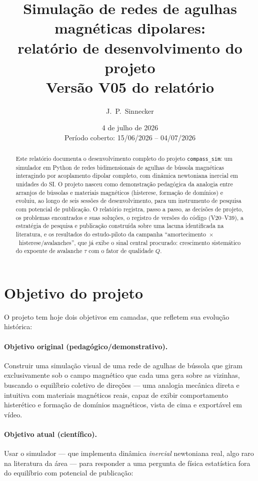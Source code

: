 \documentclass[11pt,a4paper]{article}
\title{\textbf{Simulação de redes de agulhas magnéticas dipolares:\\
relatório de desenvolvimento do projeto \code{compass\_sim}}\\[1ex]
\large Versão V05 do relatório}
\author{J.~P.~Sinnecker}
\date{4 de julho de 2026\\[0.5ex]
\small Período coberto: 15/06/2026 -- 04/07/2026}
\newcommand{\code}[1]{\texttt{#1}}
\begin{document}
\maketitle

\begin{abstract}
\noindent
Este relatório documenta o desenvolvimento completo do projeto
\code{compass\_sim}: um simulador em Python de redes bidimensionais de
agulhas de bússola magnéticas interagindo por acoplamento dipolar
completo, com dinâmica newtoniana inercial em unidades do SI. O projeto
nasceu como demonstração pedagógica da analogia entre arranjos de
bússolas e materiais magnéticos (histerese, formação de domínios) e
evoluiu, ao longo de seis sessões de desenvolvimento, para um
instrumento de pesquisa com potencial de publicação. O relatório
registra, passo a passo, as decisões de projeto, os problemas
encontrados e suas soluções, o registro de versões do código
(V20--V39), a estratégia de pesquisa e publicação construída sobre uma
lacuna identificada na literatura, e os resultados do estudo-piloto da
campanha ``amortecimento~$\times$~histerese/avalanches'', que já exibe o
sinal central procurado: crescimento sistemático do expoente de
avalanche $\tau$ com o fator de qualidade $Q$.
\end{abstract}

\tableofcontents
\newpage

\section{Objetivo do projeto}

O projeto tem hoje dois objetivos em camadas, que refletem sua evolução
histórica:

\paragraph{Objetivo original (pedagógico/demonstrativo).}
Construir uma simulação visual de uma rede de agulhas de bússola que
giram exclusivamente sob o campo magnético que cada uma gera sobre as
vizinhas, buscando o equilíbrio coletivo de direções --- uma analogia
mecânica direta e intuitiva com materiais magnéticos reais, capaz de
exibir comportamento histerético e formação de domínios magnéticos,
vista de cima e exportável em vídeo.

\paragraph{Objetivo atual (científico).}
Usar o simulador --- que implementa dinâmica \emph{inercial} newtoniana
real, algo raro na literatura da área --- para responder a uma pergunta
de física estatística fora do equilíbrio com potencial de publicação:
\end{document}
